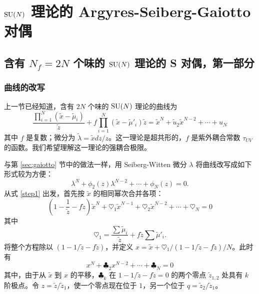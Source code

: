 \section{$\mathop{\mathrm{SU}}(N)$ 理论的 Argyres-Seiberg-Gaiotto 对偶}\label{sec:duality}
\subsection{含有 $N_f=2N$ 个味的 $\mathop{\mathrm{SU}}(N)$ 理论的 S 对偶，第一部分}
\subsubsection{曲线的改写}
上一节已经知道，含有 $2N$ 个味的 $\mathop{\mathrm{SU}}(N)$ 理论的曲线为
\begin{equation}
\frac{\prod_{i=1}^N(\tilde x-\tilde\mu_i)}{\tilde z}
+f\prod_{i=1}^N(\tilde x-\tilde\mu'_i)\tilde z
=\tilde x^N+\tilde u_2\tilde x^{N-2}+\cdots+u_N\label{step1}
\end{equation}
其中 $f$ 是复数；微分为 $\tilde\lambda=\tilde xdz/z$。这一理论是超共形的，$f$ 是紫外耦合常数 $\tau_{UV}$ 的函数。我们希望理解这一理论的强耦合极限。

与第 \ref{sec:gaiotto} 节中的做法一样，用 Seiberg-Witten 微分 $\lambda$ 将曲线改写成如下形式较为方便：
\begin{equation}
\lambda^N+\phi_2(z)\lambda^{N-2}+\cdots+\phi_N(z)=0.\label{suN-gaiotto}
\end{equation}
从式 \eqref{step1} 出发，首先按 $\tilde x$ 的相同幂次合并各项：
\begin{equation}
(1-\frac1{\tilde z}-f\tilde z)\tilde x^N
+\heartsuit_1\tilde x^{N-1}+\heartsuit_2\tilde x^{N-2}+\cdots+\heartsuit_N=0
\end{equation}
其中
\begin{equation}
\heartsuit_1=\frac{\sum\tilde\mu_i}{\tilde z}+f\tilde z\sum\tilde\mu'_i.
\end{equation}
将整个方程除以 $(1-1/\tilde z-f\tilde z)$，并定义 $x=\tilde x+\heartsuit_1/(1-1/\tilde z-f\tilde z)/N$。此时有
\begin{equation}
x^N+\clubsuit_2x^{N-2}+\cdots+\clubsuit_N=0
\end{equation}
其中，由于从 $\tilde x$ 到 $x$ 的平移，$\clubsuit_k$ 在 $1-1/\tilde z-f\tilde z=0$ 的两个零点 $\tilde z_{1,2}$ 处具有 $k$ 阶极点。令 $z=\tilde z/\tilde z_1$，使一个零点现在位于 $1$，另一个位于 $q=\tilde z_2/\tilde z_1$。

